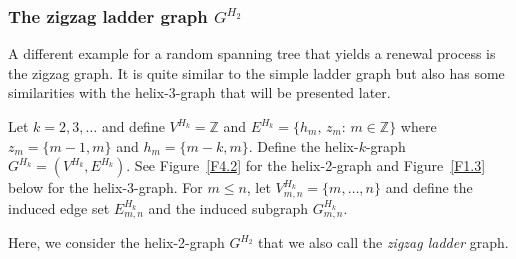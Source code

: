 \documentclass[11pt]{article}
\providecommand{\1}{\mathBB{1}}
\newcommand{\Z}{{\mathbb{Z}}}
\begin{document}
\subsubsection{The zigzag ladder graph $G^{H_2}$}
\label{S1.3.2}
A different example for a random spanning tree that yields a renewal process is the zigzag graph. It is quite similar to the simple ladder graph but also has some similarities with the helix-3-graph that will be presented later.

Let $k=2,3,\ldots$ and define $V^{H_k}=\Z$ and $E^{H_k}=\{h_m,\,z_m:\,m\in\Z\}$ where $z_m=\{m-1,m\}$ and $h_m=\{m-k,m\}$. Define the helix-$k$-graph $G^{H_k}=(V^{H_k},E^{H_k})$. See Figure~\ref{F4.2} for the helix-2-graph and Figure~\ref{F1.3} below for the helix-3-graph. For $m\leq n$, let $V^{H_k}_{m,n}=\{m,\ldots,n\}$ and define the induced edge set $E^{H_k}_{m,n}$ and the induced subgraph $G^{H_k}_{m,n}$.

Here, we consider the helix-2-graph $G^{H_2}$ that we also call the \emph{zigzag ladder} graph.
\end{document}
